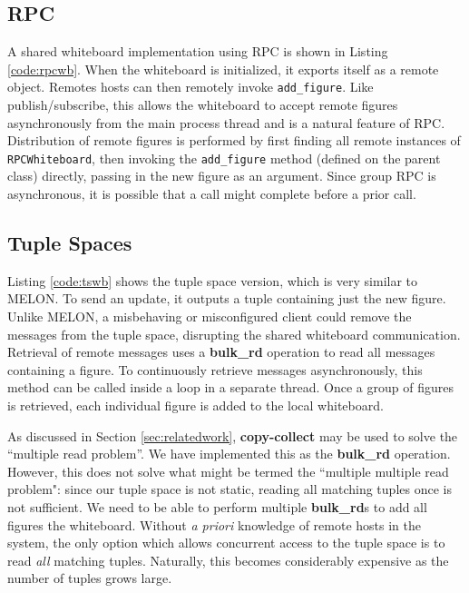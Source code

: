 \subsection{RPC}

A shared whiteboard implementation using RPC is shown in Listing \ref{code:rpcwb}. When the whiteboard is initialized, it exports itself as a remote object. Remotes hosts can then remotely invoke \texttt{add\_figure}. Like publish/subscribe, this allows the whiteboard to accept remote figures asynchronously from the main process thread and is a natural feature of RPC. Distribution of remote figures is performed by first finding all remote instances of \texttt{RPCWhiteboard}, then invoking the \texttt{add\_figure} method (defined on the parent class) directly, passing in the new figure as an argument. Since group RPC is asynchronous, it is possible that a call might complete before a prior call.

\subsection{Tuple Spaces}

Listing \ref{code:tswb} shows the tuple space version, which is very similar to MELON. To send an update, it outputs a tuple containing just the new figure. Unlike MELON, a misbehaving or misconfigured client could remove the messages from the tuple space, disrupting the shared whiteboard communication. Retrieval of remote messages uses a \textbf{bulk\_rd} operation to read all messages containing a figure. To continuously retrieve messages asynchronously, this method can be called inside a loop in a separate thread. Once a group of figures is retrieved, each individual figure is added to the local whiteboard. 

As discussed in Section \ref{sec:relatedwork}, \textbf{copy-collect} may be used to solve the ``multiple read problem''. We have implemented this as the \textbf{bulk\_rd} operation. However, this does not solve what might be termed the ``multiple multiple read problem": since our tuple space is not static, reading all matching tuples once is not sufficient. We need to be able to perform multiple \textbf{bulk\_rd}s to add all figures the whiteboard. Without \textit{a priori} knowledge of remote hosts in the system, the only option which allows concurrent access to the tuple space is to read \textit{all} matching tuples. Naturally, this becomes considerably expensive as the number of tuples grows large.


